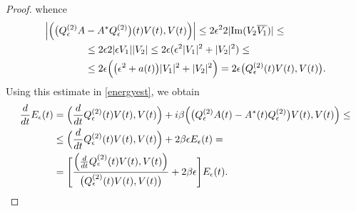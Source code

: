 \documentclass[12pt,oneside,a4paper]{book}
\numberwithin{equation}{section}     %
\theoremstyle{plain}
\theoremstyle{definition}
\newcommand{\Imp}{{\rm Im}}
\begin{document}
\begin{proof}
	whence
	\begin{align}\notag
	\Big|\Big(\big(Q_\epsilon^{(2)}A&-A^*Q_\epsilon^{(2)}\big)(t)V(t),V(t)\Big)\Big|\leq 2\epsilon^2 2|\Imp(V_2\overline{V_1})| \leq\\\notag
	&\leq 2\epsilon  2|\epsilon V_1||V_2|\leq 2\epsilon (\epsilon^2|V_1|^2+|V_2|^2)\leq\\\notag
	&\leq 2\epsilon\Big(\big(\epsilon^2+a(t)\big)|V_1|^2+|V_2|^2\Big)= 2\epsilon \big(Q_\epsilon^{(2)}(t)V(t),V(t)\big).
	\end{align}
	Using this estimate in \eqref{energyest}, we obtain
	\begin{align}\notag
	\frac{d}{dt}E_\epsilon(t)&= \Big(\frac{d}{dt}Q_\epsilon^{(2)}(t)V(t),V(t)\Big)+i\beta\Big(\big(Q_\epsilon^{(2)}A(t)-A^*(t)Q_\epsilon^{(2)}\big)V(t),V(t)\Big)\leq\\ \notag
	&\leq \Big(\frac{d}{dt}Q_\epsilon^{(2)}(t)V(t),V(t)\Big) +2\beta\epsilon E_\epsilon(t)=\\
	&= \Bigg[\frac{\Big(\frac{d}{dt}Q_\epsilon^{(2)}(t)V(t),V(t)\Big)}{\big(Q_\epsilon^{(2)}(t)V(t),V(t)\big)}+ 2 \beta \epsilon\Bigg]E_\epsilon(t).\label{eq:quasiEnergy}
	\end{align}
	

\end{proof}
\end{document}
